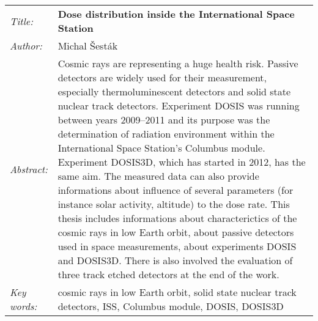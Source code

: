 \begin{tabularx}{\textwidth}{>{\itshape}l X}
  Title: & \textbf{Dose distribution inside the International Space Station}\\
  Author: & Michal Šesták\\
  Abstract: & Cosmic rays are representing a huge health risk. Passive detectors are widely used for their measurement, especially thermoluminescent detectors and solid state nuclear track detectors. Experiment DOSIS was running between years 2009--2011 and its purpose was the determination of radiation environment within the International Space Station's Columbus module. Experiment DOSIS3D, which has started in 2012, has the same aim. The measured data can also provide informations about influence of several parameters (for instance solar activity, altitude) to the dose rate. This thesis includes informations about characterictics of the cosmic rays in low Earth orbit, about passive detectors used in space measurements, about experiments DOSIS and
  DOSIS3D. There is also involved the evaluation
  of three track etched detectors at the end of the work.\\
  Key words: & cosmic rays in low Earth orbit, solid state nuclear track detectors, ISS, Columbus module, DOSIS, DOSIS3D
\end{tabularx}
\newpage
